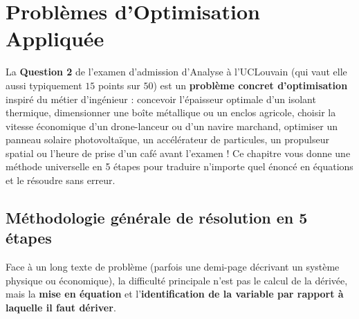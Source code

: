\chapter{Problèmes d'Optimisation Appliquée}

La \textbf{Question 2} de l'examen d'admission d'Analyse à l'UCLouvain (qui vaut elle aussi typiquement $15$ points sur $50$) est un \textbf{problème concret d'optimisation} inspiré du métier d'ingénieur : concevoir l'épaisseur optimale d'un isolant thermique, dimensionner une boîte métallique ou un enclos agricole, choisir la vitesse économique d'un drone-lanceur ou d'un navire marchand, optimiser un panneau solaire photovoltaïque, un accélérateur de particules, un propulseur spatial ou l'heure de prise d'un café avant l'examen ! Ce chapitre vous donne une méthode universelle en 5 étapes pour traduire n'importe quel énoncé en équations et le résoudre sans erreur.

\section{Méthodologie générale de résolution en 5 étapes}

Face à un long texte de problème (parfois une demi-page décrivant un système physique ou économique), la difficulté principale n'est pas le calcul de la dérivée, mais la \textbf{mise en équation} et l'\textbf{identification de la variable par rapport à laquelle il faut dériver}.

